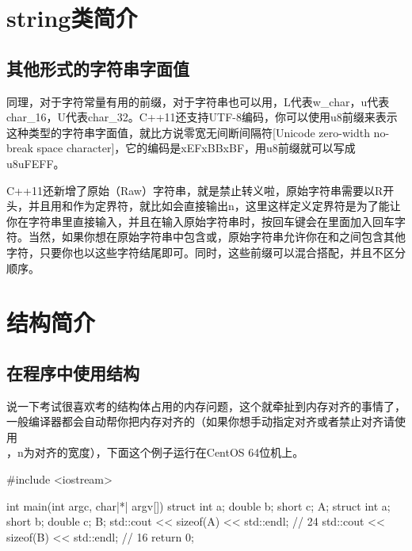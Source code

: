 \section{string类简介}

\addtocounter{subsection}{4}

\subsection{其他形式的字符串字面值}

同理，对于字符常量有用的前缀，对于字符串也可以用，L代表w\_char，u代表char\_16，U代表char\_32。C++11还支持UTF-8编码，你可以使用u8前缀来表示这种类型的字符串字面值，就比方说零宽无间断间隔符[Unicode zero-width no-break space character]，它的编码是\leftqm\mybackslash xEF\mybackslash xBB\mybackslash xBF\rightqm，用u8前缀就可以写成u8\leftqm\mybackslash uFEFF\rightqm。\dpar

C++11还新增了原始（Raw）字符串，就是禁止转义啦，原始字符串需要以R开头，并且用和作为定界符，就比如会直接输出\mybackslash n，这里这样定义定界符是为了能让你在字符串里直接输入，并且在输入原始字符串时，按回车键会在里面加入回车字符。当然，如果你想在原始字符串中包含或，原始字符串允许你在和\fira{(}之间包含其他字符，只要你也以这些字符结尾即可。同时，这些前缀可以混合搭配，并且不区分顺序。

\section{结构简介}

\subsection{在程序中使用结构}

说一下考试很喜欢考的结构体占用的内存问题，这个就牵扯到内存对齐的事情了，一般编译器都会自动帮你把内存对齐的（如果你想手动指定对齐或者禁止对齐请使用\\ ，n为对齐的宽度），下面这个例子运行在CentOS 64位机上。

\begin{cpp}
#include <iostream>

int main(int argc, char|*| argv[]) {
    struct {
        int a;
        double b;
        short c;
    } A;
    struct {
        int a;
        short b;
        double c;
    } B;
    std::cout << sizeof(A) << std::endl; // 24
    std::cout << sizeof(B) << std::endl; // 16
    return 0;
}
\end{cpp}

